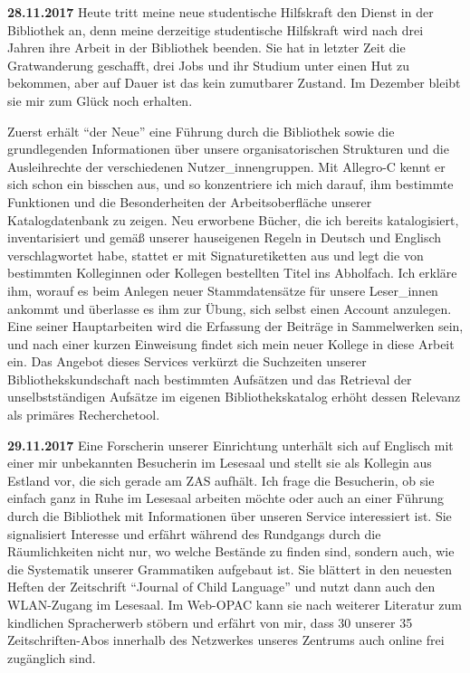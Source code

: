 \documentclass[a4paper,
fontsize=11pt,
oneside,
numbers=noperiodatend,
parskip=half-,
bibliography=totoc,
final
]{scrartcl}
\begin{document}
\textbf{28.11.2017} Heute tritt meine neue studentische Hilfskraft den
Dienst in der Bibliothek an, denn meine derzeitige studentische
Hilfskraft wird nach drei Jahren ihre Arbeit in der Bibliothek beenden.
Sie hat in letzter Zeit die Gratwanderung geschafft, drei Jobs und ihr
Studium unter einen Hut zu bekommen, aber auf Dauer ist das kein
zumutbarer Zustand. Im Dezember bleibt sie mir zum Glück noch erhalten.

Zuerst erhält \enquote{der Neue} eine Führung durch die Bibliothek sowie
die grundlegenden Informationen über unsere organisatorischen Strukturen
und die Ausleihrechte der verschiedenen Nutzer\_innengruppen. Mit
Allegro-C kennt er sich schon ein bisschen aus, und so konzentriere ich
mich darauf, ihm bestimmte Funktionen und die Besonderheiten der
Arbeitsoberfläche unserer Katalogdatenbank zu zeigen. Neu erworbene
Bücher, die ich bereits katalogisiert, inventarisiert und gemäß unserer
hauseigenen Regeln in Deutsch und Englisch verschlagwortet habe, stattet
er mit Signaturetiketten aus und legt die von bestimmten Kolleginnen
oder Kollegen bestellten Titel ins Abholfach. Ich erkläre ihm, worauf es
beim Anlegen neuer Stammdatensätze für unsere Leser\_innen ankommt und
überlasse es ihm zur Übung, sich selbst einen Account anzulegen. Eine
seiner Hauptarbeiten wird die Erfassung der Beiträge in Sammelwerken
sein, und nach einer kurzen Einweisung findet sich mein neuer Kollege in
diese Arbeit ein. Das Angebot dieses Services verkürzt die Suchzeiten
unserer Bibliothekskundschaft nach bestimmten Aufsätzen und das
Retrieval der unselbstständigen Aufsätze im eigenen Bibliothekskatalog
erhöht dessen Relevanz als primäres Recherchetool.

\textbf{29.11.2017} Eine Forscherin unserer Einrichtung unterhält sich
auf Englisch mit einer mir unbekannten Besucherin im Lesesaal und stellt
sie als Kollegin aus Estland vor, die sich gerade am ZAS aufhält. Ich
frage die Besucherin, ob sie einfach ganz in Ruhe im Lesesaal arbeiten
möchte oder auch an einer Führung durch die Bibliothek mit Informationen
über unseren Service interessiert ist. Sie signalisiert Interesse und
erfährt während des Rundgangs durch die Räumlichkeiten nicht nur, wo
welche Bestände zu finden sind, sondern auch, wie die Systematik unserer
Grammatiken aufgebaut ist. Sie blättert in den neuesten Heften der
Zeitschrift \enquote{Journal of Child Language} und nutzt dann auch den
WLAN-Zugang im Lesesaal. Im Web-OPAC kann sie nach weiterer Literatur
zum kindlichen Spracherwerb stöbern und erfährt von mir, dass 30 unserer
35 Zeitschriften-Abos innerhalb des Netzwerkes unseres Zentrums auch
online frei zugänglich sind.
\end{document}
